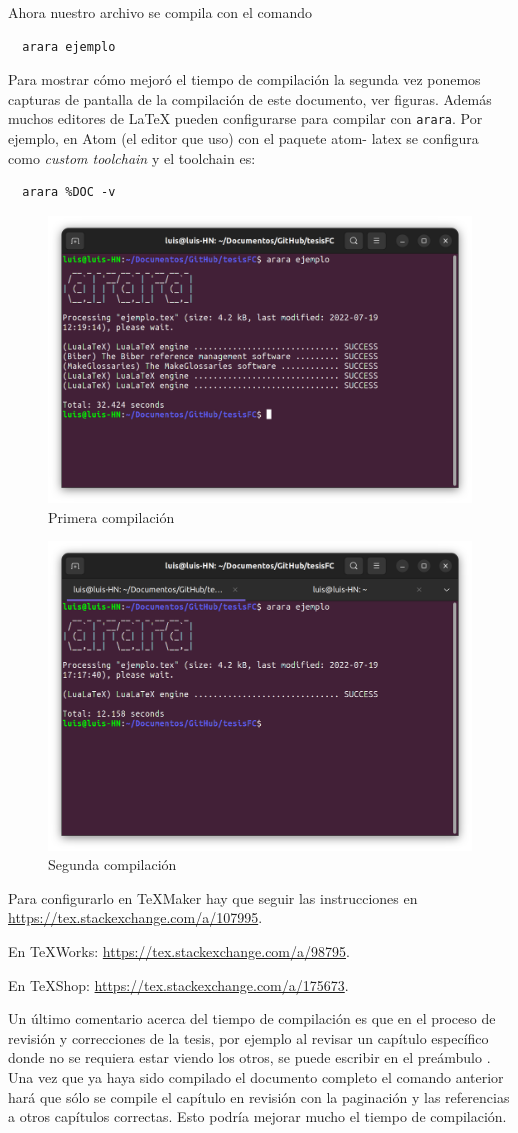 Ahora nuestro archivo se compila con el comando
\begin{verbatim}
  arara ejemplo
\end{verbatim}
Para mostrar cómo mejoró el tiempo de compilación la segunda
vez ponemos capturas de pantalla de la compilación de este documento, ver figuras.
Además muchos editores de \LaTeX{} pueden configurarse para compilar con
\texttt{arara}.  Por ejemplo, en Atom (el editor que uso) con el paquete atom-
latex se configura como \textit{custom toolchain} y el toolchain es:
\begin{verbatim}
  arara %DOC -v
\end{verbatim}

\begin{figure}[h]
\centering
  \includegraphics[width=0.7\linewidth]{primera}
  \caption{Primera compilación}
  \label{fig:primera}
\end{figure}

\begin{figure}[h]
\centering
  \includegraphics[width=0.7\linewidth]{segunda}
  \caption{Segunda compilación}
  \label{fig:segunda}
\end{figure}

Para configurarlo en TeXMaker hay que seguir las instrucciones en
\url{https://tex.stackexchange.com/a/107995}.

En TeXWorks: \url{https://tex.stackexchange.com/a/98795}.

En TeXShop: \url{https://tex.stackexchange.com/a/175673}.

Un último comentario acerca del tiempo de compilación es que en el proceso
de revisión y correcciones de la tesis, por ejemplo al revisar un capítulo
específico donde no se requiera estar viendo los otros, se puede escribir en
el preámbulo \verb||. Una vez que ya haya
sido compilado el documento completo el comando anterior hará que sólo se
compile el capítulo en revisión con la paginación y las referencias a otros
capítulos correctas. Esto podría mejorar mucho el tiempo de compilación.
